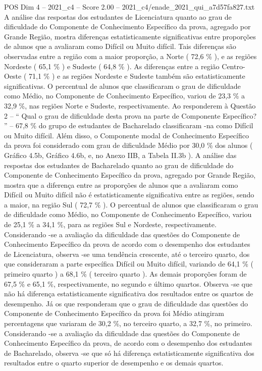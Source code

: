 \begin{textsample}{POS Dim 4 – 2021\_c4 – Score 2.00 – 2021\_c4/enade\_2021\_qui\_a7d57fa827.txt}
A análise das respostas dos estudantes de Licenciatura quanto ao grau de dificuldade do Componente de Conhecimento Específico da prova, agregado por Grande Região, mostra diferenças estatisticamente significativas entre proporções de alunos que a avaliaram como Difícil ou Muito difícil.
Tais diferenças são observadas entre a região com a maior proporção, a Norte ( 72,6 \% ), e as regiões Nordeste ( 65,1 \% ) e Sudeste ( 64,8 \% ).
As diferenças entre a região Centro-Oeste ( 71,1 \% ) e as regiões Nordeste e Sudeste também são estatisticamente significativas.
O percentual de alunos que classificaram o grau de dificuldade como Médio, no Componente de Conhecimento Específico, variou de 23,3 \% a 32,9 \%, nas regiões Norte e Sudeste, respectivamente.
Ao responderem à Questão 2 – “ Qual o grau de dificuldade desta prova na parte de Componente Específico? ” – 67,8 \% do grupo de estudantes de Bacharelado classificaram -na como Difícil ou Muito difícil.
Além disso, o Componente modal de Conhecimento Específico da prova foi considerado com grau de dificuldade Médio por 30,0 \% dos alunos ( Gráfico 4.5b, Gráfico 4.6b, e, no Anexo IIB, a Tabela II.3b ).
A análise das respostas dos estudantes de Bacharelado quanto ao grau de dificuldade do Componente de Conhecimento Específico da prova, agregado por Grande Região, mostra que a diferença entre as proporções de alunos que a avaliaram como Difícil ou Muito difícil não é estatisticamente significativa entre as regiões, sendo a maior, na região Sul ( 72,7 \% ).
O percentual de alunos que classificaram o grau de dificuldade como Médio, no Componente de Conhecimento Específico, variou de 25,1 \% a 34,1 \%, para as regiões Sul e Nordeste, respectivamente.
Considerando -se a avaliação da dificuldade das questões do Componente de Conhecimento Específico da prova de acordo com o desempenho dos estudantes de Licenciatura, observa -se uma tendência crescente, até o terceiro quarto, dos que consideraram a parte específica Difícil ou Muito difícil, variando de 64,1 \% ( primeiro quarto ) a 68,1 \% ( terceiro quarto ).
As demais proporções foram de 67,5 \% e 65,1 \%, respectivamente, no segundo e último quartos.
Observa -se que não há diferença estatisticamente significativa dos resultados entre os quartos de desempenho.
Já os que responderam que o grau de dificuldade das questões do Componente de Conhecimento Específico da prova foi Médio atingiram percentagens que variaram de 30,2 \%, no terceiro quarto, a 32,7 \%, no primeiro.
Considerando -se a avaliação da dificuldade das questões do Componente de Conhecimento Específico da prova, de acordo com o desempenho dos estudantes de Bacharelado, observa -se que só há diferença estatisticamente significativa dos resultados entre o quarto superior de desempenho e os demais quartos.

\end{textsample}
